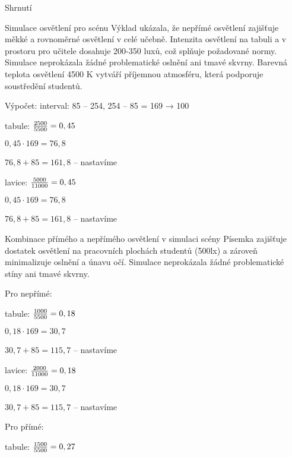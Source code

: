 

\secc Shrnutí



Simulace osvětlení pro scénu Výklad ukázala, že nepřímé osvětlení zajišťuje měkké
a rovnoměrné osvětlení v celé učebně. Intenzita osvětlení na tabuli a v prostoru pro učitele dosahuje 200-350 luxů,
což splňuje požadované normy. Simulace neprokázala žádné problematické oslnění ani tmavé skvrny. Barevná teplota
osvětlení 4500 K vytváří příjemnou atmosféru, která podporuje soustředění studentů.

Výpočet: interval: 85 – 254, 254 – 85 = 169 → 100 \pcent

tabule: ${2500 \over 5500} = 0,45$

        ${0,45 \cdot 169} = 76,8$

        $76,8 + 85 = 161,8$ – nastavíme

lavice: ${5000 \over 11000} = 0,45$

        ${0,45 \cdot 169} = 76,8$

        $76,8 + 85 = 161,8$ – nastavíme


Kombinace přímého a nepřímého osvětlení v simulaci scény Písemka zajišťuje dostatek osvětlení na pracovních plochách studentů
(500lx) a zároveň minimalizuje oslnění a únavu očí.
Simulace neprokázala žádné problematické stíny ani tmavé skvrny.

Pro nepřímé:

tabule: ${1000 \over 5500} = 0,18$

        ${0,18 \cdot 169} = 30,7$

        $30,7 + 85 = 115,7$ – nastavíme

lavice: ${2000 \over 11000} = 0,18$

        ${0,18 \cdot 169} = 30,7$

        $30,7 + 85 = 115,7$ – nastavíme

Pro přímé:

tabule: ${1500 \over 5500} = 0,27$

